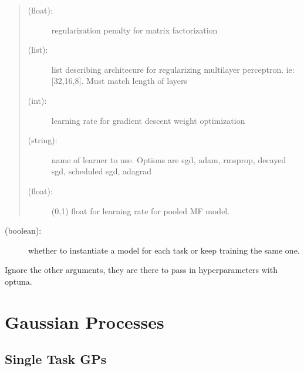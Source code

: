 \documentclass[letterpaper,10pt,english,openany,oneside]{sphinxmanual}
\begin{document}
\begin{fulllineitems}
\begin{description}
\begin{description}
\begin{quote}
\begin{description}
\item[{ (float):}] \leavevmode
regularization penalty for matrix factorization

\item[{ (list):}] \leavevmode
list describing architecure for regularizing multilayer perceptron. ie: {[}32,16,8{]}. Must match length of layers

\item[{ (int):}] \leavevmode
learning rate for gradient descent weight optimization

\item[{ (string):}] \leavevmode
name of learner to use. Options are sgd, adam, rmsprop, decayed sgd, scheduled sgd, adagrad

\item[{ (float):}] \leavevmode
(0,1) float for learning rate for pooled MF model.

\end{description}
\end{quote}
\begin{description}
\item[{ (boolean):}] \leavevmode
whether to instantiate a model for each task or keep training the same one.

\end{description}

\end{description}

Ignore the other arguments, they are there to pass in hyperparameters with optuna.

\end{description}

\end{fulllineitems}



\chapter{Gaussian Processes}
\label{\detokenize{gp:gaussian-processes}}\label{\detokenize{gp::doc}}

\section{Single Task GPs}
\label{\detokenize{gp:single-task-gps}}
\end{document}
